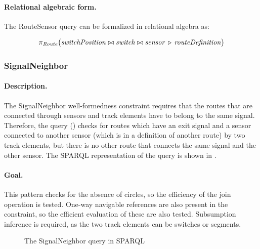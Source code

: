 \paragraph{Relational algebraic form.}  The \textsf{RouteSensor} query can be formalized in relational algebra as:


\[
\pi_{\mathit{Route}} \big( \mathit{switchPosition} \bowtie \mathit{switch} \bowtie \mathit{sensor} \, \triangleright \, \mathit{routeDefinition} \big)
\]

\subsubsection{SignalNeighbor}

\paragraph{Description.} The \textsf{SignalNeighbor} well-formedness constraint requires that the routes that are connected through sensors and track elements have to belong to the same signal. Therefore, the query () checks for routes which have an exit signal and a sensor connected to another sensor (which is in a definition of another route) by two track elements, but there is no other route that connects the same signal and the other sensor. The SPARQL representation of the query is shown in .

\paragraph{Goal.} This pattern checks for the absence of circles, so the efficiency of the join operation is tested. One-way navigable references are also present in the constraint, so the efficient evaluation of these are also tested. Subsumption inference is required, as the two track elements can be switches or segments.

\begin{figure}[Htb]
\centering
\begin{minipage}{0.6\textwidth}
  { \alignListing
    }
  \caption{The \textsf{SignalNeighbor} query in SPARQL}
  \label{lst:signalneighbor-sparql}
\end{minipage}
\end{figure}

